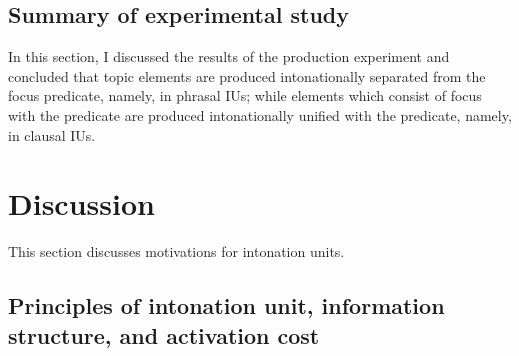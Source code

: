 
\subsection{Summary of experimental study}

In this section,
I discussed the results of the production experiment
and concluded that
topic elements are produced intonationally separated from the focus predicate,
namely, in phrasal IUs;
while elements which consist of focus with the predicate are produced intonationally unified with the predicate,
namely, in clausal IUs.


\section{Discussion}\label{Int:Disc}

This section discusses motivations for intonation units.

\subsection{Principles of intonation unit, information structure, and activation cost}

